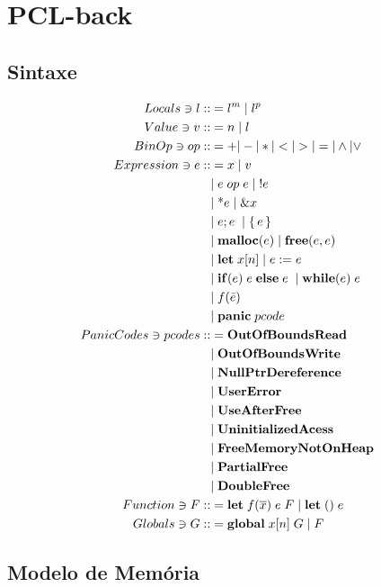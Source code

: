 \chapter{PCL-back}



\section{Sintaxe}
\begingroup
\setlength{\jot}{-0.2ex} 
	\begin{align*}
		Locals \ni l ::&= l^m \;|\; l^p &&\\ 
		Value \ni v ::&= n \;|\; l && \\
		BinOp \ni op ::&= + | - | * | < | > | = | \land | \lor \\
		Expression \ni e ::&= x \;|\; v \\
		&|\; e\; op\; e \;|\; !e  \\
		&|\; \text{*}e \;|\; \&x \\
		&|\; e;e \; \;|\; \{\,e\,\} \; \\ 
		&|\; \mathbf{malloc}(e) \;|\; \mathbf{free}(e, e) \; \\ 
		&|\; \mathbf{let}\; x[n] \;|\; e := e \; \\
		&|\; \mathbf{if}(e) \; e \; \mathbf{else} \; e \; \;|\; \mathbf{while}(e) \; e \\
		&|\; f(\bar e) \\ 
		&|\; \mathbf{panic}\;pcode \\ 
		PanicCodes \ni pcodes ::&= \mathbf{OutOfBoundsRead}\\
		&|\; \mathbf{OutOfBoundsWrite}\\
		&|\; \mathbf{NullPtrDereference}\\
		&|\; \mathbf{UserError}\\
		&|\; \mathbf{UseAfterFree}\\
		&|\; \mathbf{UninitializedAcess}\\
		&|\; \mathbf{FreeMemoryNotOnHeap}\\
		&|\; \mathbf{PartialFree}\\
		&|\; \mathbf{DoubleFree}\\
		Function \ni F ::&= \mathbf{let} \; f(\overline{x})\; e \; F \; | \; \mathbf{let}\;() \; e \\
		Globals \ni G ::&= \mathbf{global}\; x[n] \;G \;|\; F
	\end{align*}
\endgroup


\section{Modelo de Memória}

